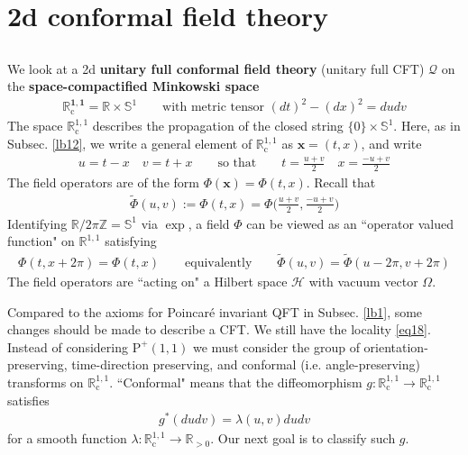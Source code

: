 \documentclass[12pt,b5paper,notitlepage]{article}
\theoremstyle{definition}
\theoremstyle{plain}
\newcommand{\mc}{\mathcal}
\newcommand{\wtd}{\widetilde}
\newcommand{\Zbb}{\mathbb Z}
\newcommand{\Rbb}{\mathbb R}
\newcommand{\Sbb}{{\mathbb S}}
\newcommand{\xbf}{\mathbf x}
\newcommand{\Rc}{\mathbb R^{1,1}_{\mathrm{c}}}
\numberwithin{equation}{section}
\begin{document}
\section{2d conformal field theory}


\subsection{}

We look at a 2d \textbf{unitary full conformal field theory} (unitary full CFT) $\mc Q$ on the \textbf{space-compactified Minkowski space}\index{R@$\Rc$}
\begin{align*}
\pmb{\Rc}=\Rbb\times\Sbb^1\qquad \text{with metric tensor }(dt)^2-(dx)^2=dudv
\end{align*}
The space $\Rc$ describes the propagation of the closed string $\{0\}\times\Sbb^1$. Here, as in Subsec. \ref{lb12}, we write a general element of $\Rc$ as $\xbf=(t,x)$, and write
\begin{align*}
u=t-x\quad v=t+x\qquad\text{so that}\qquad t=\frac{u+v}2\quad x=\frac{-u+v}2
\end{align*}
The field operators are of the form $\Phi(\xbf)=\Phi(t,x)$. Recall that 
\begin{align*}
\wtd \Phi(u,v):=\Phi(t,x)=\Phi\big(\frac{u+v}2,\frac{-u+v}2\big)
\end{align*}
Identifying $\Rbb/2\pi\Zbb=\Sbb^1$ via $\exp$, a field $\Phi$ can be viewed as an ``operator valued function" on $\Rbb^{1,1}$ satisfying
\begin{align}\label{eq29}
\Phi(t,x+2\pi)=\Phi(t,x)\qquad\text{equivalently}\qquad \wtd\Phi(u,v)=\wtd\Phi(u-2\pi,v+2\pi)
\end{align}
The field operators are ``acting on" a Hilbert space $\mc H$ with vacuum vector $\Omega$.


Compared to the axioms for Poincar\'e invariant QFT in Subsec. \ref{lb1}, some changes should be made to describe a CFT. We still have the locality \eqref{eq18}. Instead of considering $\mathrm{P}^+(1,1)$ we must consider the group of orientation-preserving, time-direction preserving, and conformal (i.e. angle-preserving) transforms on $\Rc$. ``Conformal" means that the diffeomorphism $g:\Rc\rightarrow\Rc$ satisfies
\begin{align*}
g^*(dudv)=\lambda(u,v)dudv
\end{align*}
for a smooth function $\lambda:\Rc\rightarrow\Rbb_{>0}$. Our next goal is to classify such $g$.


\subsection{}
\end{document}
